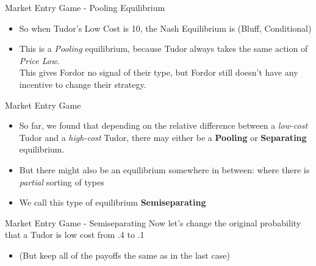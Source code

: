 
\begin{frame}{Market Entry Game - Pooling Equilibrium}
  \begin{itemize}
    \item So when Tudor's Low Cost is \alert{10}, 
    the Nash Equilibrium is (\alert{Bluff}, Conditional)
    \item This is a \textit{Pooling} equilibrium,
    because Tudor always takes the same action of \textit{Price Low}. \\ 
    This gives Fordor no signal of their type, 
    but Fordor still doesn't have any incentive to change their strategy.
  \end{itemize}
\end{frame}


\begin{frame}{Market Entry Game}
  \begin{itemize}
    \item So far, we found that depending on the relative difference
    between a \textit{low-cost} Tudor and a \textit{high-cost} Tudor,
    there may either be a \textbf{Pooling} or \textbf{Separating} equilibrium.
    \item But there might also be an equilibrium somewhere in between: 
    where there is \textit{partial} sorting of types
    \item We call this type of equilibrium \textbf{Semiseparating}
  \end{itemize}
\end{frame}


\begin{frame}{Market Entry Game - Semiseparating}
  Now let's change the original probability that a Tudor is low cost
  from .4 to .1
  \begin{itemize}
    \item (But keep all of the payoffs the same as in the last case) 
  \end{itemize}
\end{frame}


